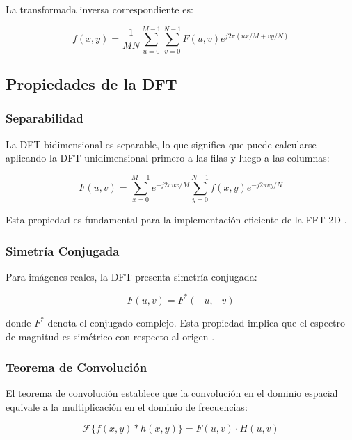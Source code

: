 \documentclass[conference]{IEEEtran}
\begin{document}
La transformada inversa correspondiente es:

\begin{equation}
f(x,y) = \frac{1}{MN} \sum_{u=0}^{M-1} \sum_{v=0}^{N-1} F(u,v) e^{j2\pi(ux/M + vy/N)}
\label{eq:idft2d}
\end{equation}

\subsection{Propiedades de la DFT}

\subsubsection{Separabilidad}

La DFT bidimensional es separable, lo que significa que puede calcularse aplicando la DFT unidimensional primero a las filas y luego a las columnas:

\begin{equation}
F(u,v) = \sum_{x=0}^{M-1} e^{-j2\pi ux/M} \sum_{y=0}^{N-1} f(x,y) e^{-j2\pi vy/N}
\label{eq:separabilidad}
\end{equation}

Esta propiedad es fundamental para la implementación eficiente de la FFT 2D \cite{groningen2024}.

\subsubsection{Simetría Conjugada}

Para imágenes reales, la DFT presenta simetría conjugada:

\begin{equation}
F(u,v) = F^*(-u,-v)
\label{eq:simetria}
\end{equation}

donde $F^*$ denota el conjugado complejo. Esta propiedad implica que el espectro de magnitud es simétrico con respecto al origen \cite{smith2003}.

\subsubsection{Teorema de Convolución}

El teorema de convolución establece que la convolución en el dominio espacial equivale a la multiplicación en el dominio de frecuencias:

\begin{equation}
\mathcal{F}\{f(x,y) * h(x,y)\} = F(u,v) \cdot H(u,v)
\label{eq:convolucion}
\end{equation}
\end{document}
